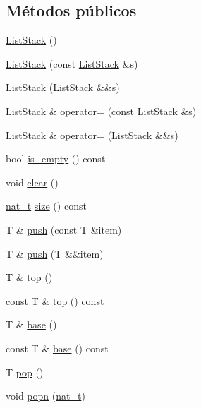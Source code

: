 \subsection*{Métodos públicos}
\begin{DoxyCompactItemize}
\item 
\hyperlink{class_designar_1_1_list_stack_af48928af17e98272785d4f07d229ac12}{List\+Stack} ()
\item 
\hyperlink{class_designar_1_1_list_stack_adee9acd5a1b6f6e9327fc20126caa2ed}{List\+Stack} (const \hyperlink{class_designar_1_1_list_stack}{List\+Stack} \&s)
\item 
\hyperlink{class_designar_1_1_list_stack_ab0b28b16213cbc71e6132b3508838013}{List\+Stack} (\hyperlink{class_designar_1_1_list_stack}{List\+Stack} \&\&s)
\item 
\hyperlink{class_designar_1_1_list_stack}{List\+Stack} \& \hyperlink{class_designar_1_1_list_stack_a324b12f4699962b0cbbdf12c80fbba44}{operator=} (const \hyperlink{class_designar_1_1_list_stack}{List\+Stack} \&s)
\item 
\hyperlink{class_designar_1_1_list_stack}{List\+Stack} \& \hyperlink{class_designar_1_1_list_stack_ae74bc2ebc11f8ebb3d98e700f4cbe9c3}{operator=} (\hyperlink{class_designar_1_1_list_stack}{List\+Stack} \&\&s)
\item 
bool \hyperlink{class_designar_1_1_list_stack_a78ec42650d4028911a0054f6baaa673a}{is\+\_\+empty} () const
\item 
void \hyperlink{class_designar_1_1_list_stack_aef07f86ff93ad1742207df436ba71aaa}{clear} ()
\item 
\hyperlink{namespace_designar_aa72662848b9f4815e7bf31a7cf3e33d1}{nat\+\_\+t} \hyperlink{class_designar_1_1_list_stack_abec63f99f62a9b7d92e1a051767017dc}{size} () const
\item 
T \& \hyperlink{class_designar_1_1_list_stack_a02d19090b599fd54ebb5e693d0a8d2d0}{push} (const T \&item)
\item 
T \& \hyperlink{class_designar_1_1_list_stack_a96bb73a3658f95565769e8b50c903f88}{push} (T \&\&item)
\item 
T \& \hyperlink{class_designar_1_1_list_stack_a5b6e47be80da93039d31cd885e97cf34}{top} ()
\item 
const T \& \hyperlink{class_designar_1_1_list_stack_a6eafdfa1a1a43b4cbbe27730a7dcffd3}{top} () const
\item 
T \& \hyperlink{class_designar_1_1_list_stack_a40833af5e19d5d400a962fafb2c449a3}{base} ()
\item 
const T \& \hyperlink{class_designar_1_1_list_stack_a98ea1c6dff17d53b810e6fedae85340c}{base} () const
\item 
T \hyperlink{class_designar_1_1_list_stack_a1a8a0fb51e9a31cf7b5d103a067e0cc4}{pop} ()
\item 
void \hyperlink{class_designar_1_1_list_stack_afe33f82099d4ec5f62848323edf66d30}{popn} (\hyperlink{namespace_designar_aa72662848b9f4815e7bf31a7cf3e33d1}{nat\+\_\+t})
\end{DoxyCompactItemize}


